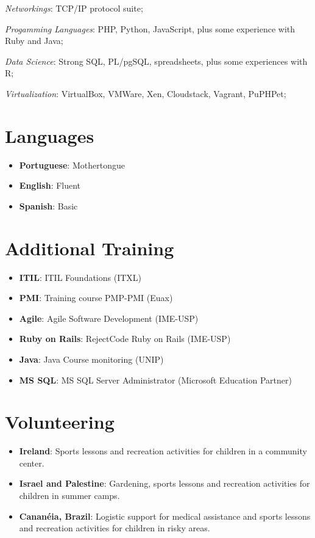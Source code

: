 \documentclass[margin]{res}
\begin{document}
\begin{resume}
  \textit{Networkings}: TCP/IP protocol suite;

  \textit{Progamming Languages}: PHP, Python, JavaScript, plus some experience with Ruby and Java;

  \textit{Data Science}: Strong SQL, PL/pgSQL, spreadsheets, plus some experiences with R;

  \textit{Virtualization}: VirtualBox, VMWare, Xen, Cloudstack, Vagrant, PuPHPet;

\section{Languages} 
  \begin{itemize}
    \vspace{2mm}
      \item \textbf{Portuguese}: Mothertongue
      \item \textbf{English}: Fluent
      \item \textbf{Spanish}: Basic
  \end{itemize}      

\section{Additional Training}
  \begin{itemize}
    \vspace{2mm}
      \item \textbf{ITIL}: ITIL Foundations (ITXL)
      \item \textbf{PMI}: Training course PMP-PMI (Euax)
      \item \textbf{Agile}: Agile Software Development (IME-USP)
      \item \textbf{Ruby on Rails}: RejectCode Ruby on Rails (IME-USP)
      \item \textbf{Java}: Java Course monitoring (UNIP)
      \item \textbf{MS SQL}: MS SQL Server Administrator (Microsoft Education Partner)
  \end{itemize}      
  
\section{Volunteering}
	\begin{itemize}
	  \vspace{2mm}
		  \item \textbf{Ireland}: Sports lessons and recreation activities for children in a community center.\vspace{1mm}
		  \item \textbf{Israel and Palestine}: Gardening, sports lessons and recreation activities for children in summer camps.\vspace{1mm}
		  \item \textbf{Cananéia, Brazil}: Logistic support for medical assistance and sports lessons and recreation activities for children in risky areas.
	\end{itemize}
 

\end{resume}
\end{document}
